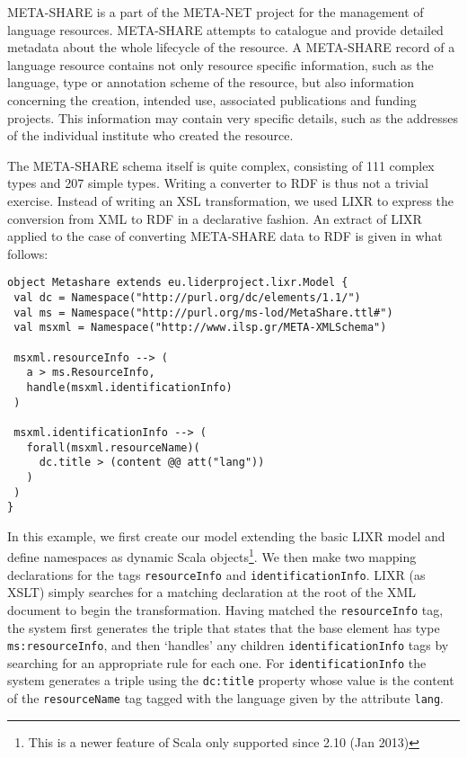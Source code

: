 \documentclass{acm_proc_article-sp}
\begin{document}
META-SHARE is a part of the META-NET project for the management of language resources. 
META-SHARE attempts to catalogue and provide detailed metadata about the whole
lifecycle of the resource. A META-SHARE record of a language resource
contains not only resource specific information, such as the language, type
or annotation scheme of the resource, but also information concerning the
creation, intended use, associated publications and funding projects. This 
information may contain very specific details, such as the addresses of the individual
institute who created the resource.

The META-SHARE schema itself is quite complex, consisting of 111 complex types
and 207 simple types.
Writing a\textsc{} converter to RDF is thus not a trivial exercise. Instead of writing an
XSL transformation, we used LIXR to express the conversion from XML to RDF in a declarative fashion.
An extract of LIXR applied to the case of converting META-SHARE data to RDF is given in what follows:

{\scriptsize
\begin{verbatim}
object Metashare extends eu.liderproject.lixr.Model {
 val dc = Namespace("http://purl.org/dc/elements/1.1/")
 val ms = Namespace("http://purl.org/ms-lod/MetaShare.ttl#")
 val msxml = Namespace("http://www.ilsp.gr/META-XMLSchema")

 msxml.resourceInfo --> (
   a > ms.ResourceInfo,
   handle(msxml.identificationInfo)
 )

 msxml.identificationInfo --> (
   forall(msxml.resourceName)(
     dc.title > (content @@ att("lang"))
   )
 )
}
\end{verbatim}}
In this example, we first create our model extending the basic LIXR model and
define namespaces as dynamic Scala objects\footnote{This is a newer feature of
Scala only supported since 2.10 (Jan 2013)}. We then make two mapping
declarations for the tags {\tt resourceInfo} and {\tt identifi\-cationInfo}. LIXR (as
XSLT) simply searches for a matching declaration at the root of the XML document
to begin the transformation. Having matched the {\tt resourceInfo} tag, the system
first generates the triple that states that the base element has type
{\tt ms:resourceInfo}, and then `handles' any children {\tt identi\-ficationInfo} tags by
searching for an appropriate rule for each one. For {\tt identificationInfo} the
system generates a triple using the {\tt dc:title} property whose value is the
content of the {\tt resourceName} tag tagged with the language given by the
attribute {\tt lang}.
\end{document}
